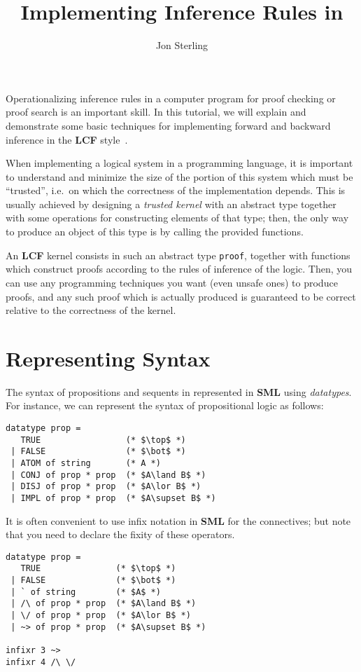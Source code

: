 \documentclass{article}
\title{Implementing Inference Rules in \StandardML}
\author{Jon Sterling}
\newcommand\FormatLang[1]{{\bfseries\sffamily #1}}
\newcommand\SML{\FormatLang{SML}}
\newcommand\LCF{\FormatLang{LCF}}
\theoremstyle{definition}
\theoremstyle{remark}
\begin{document}
\maketitle

Operationalizing inference rules in a computer program for proof
checking or proof search is an important skill. In this tutorial, we
will explain and demonstrate some basic techniques for implementing
forward and backward inference in the \LCF{}
style~\cite{gordon-milner-wadsworth:1979,paulson:1987,gordon:2000}.

When implementing a logical system in a programming language, it is
important to understand and minimize the size of the portion of this
system which must be ``trusted'', i.e.\ on which the correctness of
the implementation depends. This is usually achieved by designing a
\emph{trusted kernel} with an abstract type together with some
operations for constructing elements of that type; then, the only way
to produce an object of this type is by calling the provided
functions.

An \LCF{} kernel consists in such an abstract type \verb|proof|,
together with functions which construct proofs according to the rules
of inference of the logic. Then, you can use any programming
techniques you want (even unsafe ones) to produce proofs, and any such
proof which is actually produced is guaranteed to be correct relative
to the correctness of the kernel.

\section{Representing Syntax}

The syntax of propositions and sequents in represented in \SML{} using
\emph{datatypes}. For instance, we can represent the syntax of
propositional logic as follows:

\begin{verbatim}
datatype prop =
   TRUE                 (* $\top$ *)
 | FALSE                (* $\bot$ *)
 | ATOM of string       (* A *)
 | CONJ of prop * prop  (* $A\land B$ *)
 | DISJ of prop * prop  (* $A\lor B$ *)
 | IMPL of prop * prop  (* $A\supset B$ *)
\end{verbatim}

It is often convenient to use infix notation in \SML{} for the
connectives; but note that you need to declare the fixity of these
operators.

\begin{verbatim}
datatype prop =
   TRUE               (* $\top$ *)
 | FALSE              (* $\bot$ *)
 | ` of string        (* $A$ *)
 | /\ of prop * prop  (* $A\land B$ *)
 | \/ of prop * prop  (* $A\lor B$ *)
 | ~> of prop * prop  (* $A\supset B$ *)

infixr 3 ~>
infixr 4 /\ \/
\end{verbatim}
\end{document}
